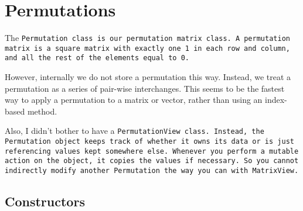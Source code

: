 
\section{Permutations}
\label{Permutation}

The \tt{Permutation} class is our permutation matrix class.
A permutation matrix is a square matrix with exactly one 1 in each row and
column, and all the rest of the elements equal to 0.

However, internally we do not store a permutation this way.
Instead, we treat a permutation as a series of pair-wise interchanges.
This seems to be the fastest way to apply a permutation to a matrix or
vector, rather than using an index-based method.

Also, I didn't bother to have a \tt{PermutationView} class.  Instead, the 
\tt{Permutation} object keeps track of whether it owns its data or is just
referencing values kept somewhere else.  Whenever you perform 
a mutable action on the object, it copies the values if necessary.
So you cannot indirectly modify another \tt{Permutation} the way you can
with \tt{MatrixView}.

\subsection{Constructors}
\label{Permutation_Constructors}

